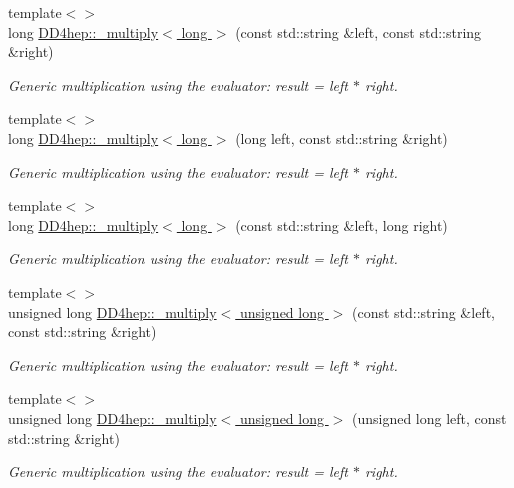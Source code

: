 \begin{DoxyCompactItemize}
{\footnotesize template$<$$>$ }\\long \hyperlink{group___d_d4_h_e_p___g_e_o_m_e_t_r_y_ga06d67a52662b07a372903712ab104b42}{D\+D4hep\+::\+\_\+multiply$<$ long $>$} (const std\+::string \&left, const std\+::string \&right)
\begin{DoxyCompactList}\small\item\em Generic multiplication using the evaluator\+: result = left $\ast$ right. \end{DoxyCompactList}\item 
{\footnotesize template$<$$>$ }\\long \hyperlink{group___d_d4_h_e_p___g_e_o_m_e_t_r_y_ga94f854e90f4a38c76c094a989b1e8a64}{D\+D4hep\+::\+\_\+multiply$<$ long $>$} (long left, const std\+::string \&right)
\begin{DoxyCompactList}\small\item\em Generic multiplication using the evaluator\+: result = left $\ast$ right. \end{DoxyCompactList}\item 
{\footnotesize template$<$$>$ }\\long \hyperlink{group___d_d4_h_e_p___g_e_o_m_e_t_r_y_ga5e0bf4f3311767d1f9a12d4e253f0ac3}{D\+D4hep\+::\+\_\+multiply$<$ long $>$} (const std\+::string \&left, long right)
\begin{DoxyCompactList}\small\item\em Generic multiplication using the evaluator\+: result = left $\ast$ right. \end{DoxyCompactList}\item 
{\footnotesize template$<$$>$ }\\unsigned long \hyperlink{group___d_d4_h_e_p___g_e_o_m_e_t_r_y_ga2a88479a0cd451a76176644b128b44ec}{D\+D4hep\+::\+\_\+multiply$<$ unsigned long $>$} (const std\+::string \&left, const std\+::string \&right)
\begin{DoxyCompactList}\small\item\em Generic multiplication using the evaluator\+: result = left $\ast$ right. \end{DoxyCompactList}\item 
{\footnotesize template$<$$>$ }\\unsigned long \hyperlink{group___d_d4_h_e_p___g_e_o_m_e_t_r_y_ga408cb5bde7b4a665c60fa0e6b8f6b06f}{D\+D4hep\+::\+\_\+multiply$<$ unsigned long $>$} (unsigned long left, const std\+::string \&right)
\begin{DoxyCompactList}\small\item\em Generic multiplication using the evaluator\+: result = left $\ast$ right. \end{DoxyCompactList}\item 

\end{DoxyCompactItemize}

